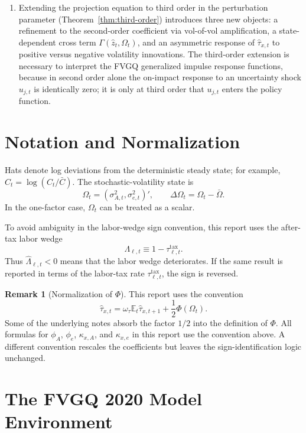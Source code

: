 \documentclass[11pt]{article}
\newcommand{\E}{\mathbb{E}}
\theoremstyle{plain}
\theoremstyle{definition}
\newtheorem{remark}{Remark}
\begin{document}
\begin{enumerate}
  \item Extending the projection equation to third order in the perturbation
  parameter (Theorem~\ref{thm:third-order}) introduces three new objects: a
  refinement to the second-order coefficient via vol-of-vol amplification, a
  state-dependent cross term $\Gamma(\hat z_t,\Omega_t)$, and an asymmetric
  response of $\hat\tau_{x,t}$ to positive versus negative volatility
  innovations. The third-order extension is necessary to interpret the FVGQ
  generalized impulse response functions, because in second order alone the
  on-impact response to an uncertainty shock $u_{j,t}$ is identically zero;
  it is only at third order that $u_{j,t}$ enters the policy function.
\end{enumerate}

\section{Notation and Normalization}

Hats denote log deviations from the deterministic steady state; for example,
$\hat C_t=\log(C_t/\bar C)$. The stochastic-volatility state is
\[
\Omega_t=(\sigma_{A,t}^2,\sigma_{e,t}^2)' ,
\qquad
\Delta\Omega_t=\Omega_t-\bar\Omega .
\]
In the one-factor case, $\Omega_t$ can be treated as a scalar.

To avoid ambiguity in the labor-wedge sign convention, this report uses the
after-tax labor wedge
\[
\Lambda_{\ell,t}\equiv 1-\tau_{\ell,t}^{\mathrm{tax}}.
\]
Thus $\hat\Lambda_{\ell,t}<0$ means that the labor wedge deteriorates. If the
same result is reported in terms of the labor-tax rate
$\tau_{\ell,t}^{\mathrm{tax}}$, the sign is reversed.

\begin{remark}[Normalization of $\Phi$]
This report uses the convention
\[
\hat\tau_{x,t}
=
\omega_\tau\E_t\hat\tau_{x,t+1}
+\frac{1}{2}\Phi(\Omega_t).
\]
Some of the underlying notes absorb the factor $1/2$ into the definition of
$\Phi$. All formulas for $\phi_A$, $\phi_e$, $\kappa_{x,A}$, and
$\kappa_{x,e}$ in this report use the convention above. A different convention
rescales the coefficients but leaves the sign-identification logic unchanged.
\end{remark}

\section{The FVGQ 2020 Model Environment}
\label{sec:fvgq-model}
\end{document}
